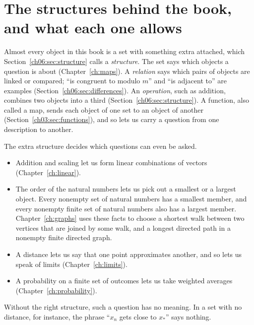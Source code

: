 \section{The structures behind the book, and what each one allows}\label{appE:sec:structures}
Almost every object in this book is a set with something extra attached, which Section~\ref{ch06:sec:structure} calls a \emph{structure}. The set says which objects a question is about (Chapter~\ref{ch:maps}). A \emph{relation} says which pairs of objects are linked or compared; ``is congruent to modulo $m$'' and ``is adjacent to'' are examples (Section~\ref{ch06:sec:differences}). An \emph{operation}, such as addition, combines two objects into a third (Section~\ref{ch06:sec:structure}). A function, also called a map, sends each object of one set to an object of another (Section~\ref{ch03:sec:functions}), and so lets us carry a question from one description to another.

The extra structure decides which questions can even be asked.
\begin{itemize}
\item Addition and scaling let us form linear combinations of vectors (Chapter~\ref{ch:linear}).
\item The order of the natural numbers lets us pick out a smallest or a largest object. Every nonempty set of natural numbers has a smallest member, and every nonempty finite set of natural numbers also has a largest member. Chapter~\ref{ch:graphs} uses these facts to choose a shortest walk between two vertices that are joined by some walk, and a longest directed path in a nonempty finite directed graph.
\item A distance lets us say that one point approximates another, and so lets us speak of limits (Chapter~\ref{ch:limits}).
\item A probability on a finite set of outcomes lets us take weighted averages (Chapter~\ref{ch:probability}).
\end{itemize}
Without the right structure, such a question has no meaning. In a set with no distance, for instance, the phrase ``$x_n$ gets close to $x_*$'' says nothing.

